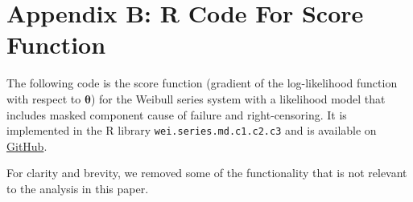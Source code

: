 \documentclass[
]{article}
\begin{document}
\hypertarget{appendix-b-r-code-for-score-function}{%
\section*{Appendix B: R Code For Score
Function}\label{appendix-b-r-code-for-score-function}}

\label{app:score-code}

The following code is the score function (gradient of the log-likelihood
function with respect to \(\boldsymbol{\theta}\)) for the Weibull series
system with a likelihood model that includes masked component cause of
failure and right-censoring. It is implemented in the R library
\texttt{wei.series.md.c1.c2.c3} and is available on
\href{https://github.com/queelius/wei.series.md.c1.c2.c3}{GitHub}.

For clarity and brevity, we removed some of the functionality that is
not relevant to the analysis in this paper.
\end{document}
